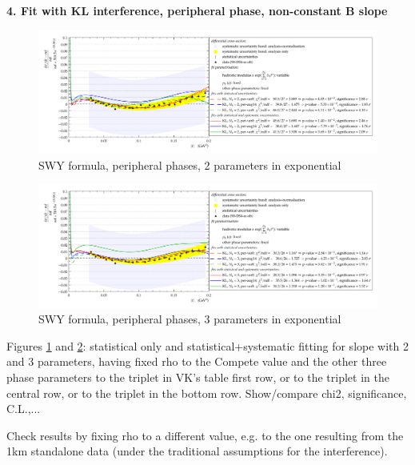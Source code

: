 {\bf 4. Fit with KL interference, peripheral phase, non-constant B slope}

\begin{figure}
\begin{center}
\includegraphics[width=18cm]{simone/90/KL,per-var048,2,stat-stat+syst.pdf}
\vskip-3mm
\caption{SWY formula, peripheral phases, 2 parameters in exponential}
\label{fig:90,KL,per,2}
\end{center}
\end{figure}

\begin{figure}
\begin{center}
\includegraphics[width=18cm]{simone/90/KL,per-var048,3,stat-stat+syst.pdf}
\vskip-3mm
\caption{SWY formula, peripheral phases, 3 parameters in exponential}
\label{fig:90,KL,per,3}
\end{center}
\end{figure}

Figures \ref{fig:90,KL,per,2} and \ref{fig:90,KL,per,3}:
statistical only and statistical+systematic fitting for slope with 2 and 3 parameters,
having fixed rho to the Compete value and the other three phase parameters to the triplet
in VK’s table first row, or to the triplet in the central row, or to the triplet in the
bottom row. Show/compare chi2, significance, C.L.,...

Check results by fixing rho to a different value, e.g. to the one resulting from the 1km
standalone data (under the traditional assumptions for the interference).

